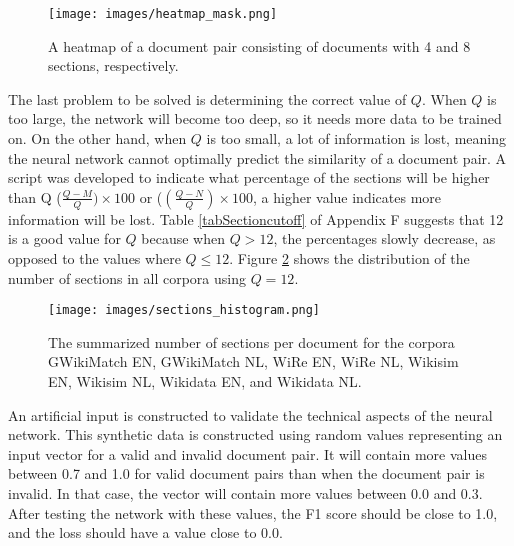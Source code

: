 \begin{figure}[h]
\centering
\captionsetup{justification=centering}
\texttt{[image: images/heatmap\_mask.png]}
\caption{A heatmap of a document pair consisting of documents with 4 and 8 sections, respectively.}
\label{imgHeatmaps}
\end{figure}


The last problem to be solved is determining the correct value of $Q$. When $Q$ is too large, the network will become too deep, so it needs more data to be trained on. On the other hand, when $Q$ is too small, a lot of information is lost, meaning the neural network cannot optimally predict the similarity of a document pair. A script was developed to indicate what percentage of the sections will be higher than Q ($\frac{Q - M}{Q}) \times 100$ or ($(\frac{Q - N}{Q}) \times 100$, a higher value indicates more information will be lost. Table \ref{tabSectioncutoff} of Appendix F suggests that 12 is a good value for $Q$ because when $Q > 12$, the percentages slowly decrease, as opposed to the values where $Q \leq 12$. Figure \ref{imgSectionsHistogram} shows the distribution of the number of sections in all corpora using $Q = 12$.\\

\begin{figure}[h]
	\centering
\captionsetup{justification=centering}

\texttt{[image: images/sections\_histogram.png]}
	
\caption{The summarized number of sections per document for the corpora GWikiMatch EN, GWikiMatch NL, WiRe EN, WiRe NL, Wikisim EN, Wikisim NL, Wikidata EN, and Wikidata NL.
}
\label{imgSectionsHistogram}
\end{figure}


An artificial input is constructed to validate the technical aspects of the neural network. This synthetic data is constructed using random values representing an input vector for a valid and invalid document pair. It will contain more values between 0.7 and 1.0 for valid document pairs than when the document pair is invalid. In that case, the vector will contain more values between 0.0 and 0.3. After testing the network with these values, the F1 score should be close to 1.0, and the loss should have a value close to 0.0.\\

